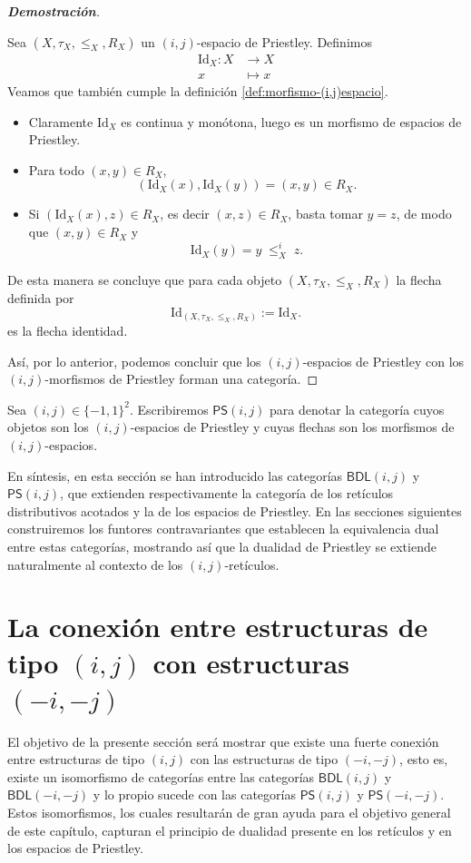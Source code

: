 \documentclass[12pt]{book}
\newcommand{\Id}{\mathrm{Id}}
\newcommand{\BDL}{\mathsf{BDL}}
\newcommand{\PS}{\mathsf{PS}}
\begin{document}
\begin{proof}[\textbf{Demostración}]
\begin{itemize}
Sea $(X,\tau_X,\le_X,R_X)$ un $(i,j)$-espacio de Priestley. Definimos
\begin{align*}
\Id_X\colon X &\to X\\
x &\mapsto x
\end{align*}
Veamos que también cumple la definición \ref{def:morfismo-(i,j)espacio}.
\begin{itemize}
\item Claramente $\Id_X$ es continua y monótona, luego es un morfismo de espacios de Priestley.

\item Para todo $(x,y)\in R_X$,
\[
(\Id_X(x),\Id_X(y))=(x,y)\in R_X.
\]

\item   Si $(\Id_X(x),z)\in R_X$, es decir $(x,z)\in R_X$, basta tomar $y=z$, de modo que $(x,y)\in R_X$ y  
\[
\Id_X(y)=y\;\le_X^i\;z.
\]
\end{itemize}

De esta manera se concluye que para cada objeto $(X,\tau_X,\le_X,R_X)$ la flecha definida por 
\[
\Id_{(X,\tau_X,\le_X,R_X)} := \Id_X.
\]
es la flecha identidad.

\end{itemize}
Así, por lo anterior, podemos concluir que los $(i,j)$-espacios de Priestley con los $(i,j)$-morfismos de Priestley forman una categoría.
\end{proof}
Sea $(i,j) \in \{-1,1\}^{2}$. Escribiremos $\PS(i,j)$ para denotar la categoría cuyos objetos son los $(i,j)$-espacios de Priestley y cuyas flechas son los morfismos de $(i,j)$-espacios.


\medskip
En síntesis, en esta sección se han introducido las categorías
$\BDL(i,j)$ y $\mathsf{PS}(i,j)$,
que extienden respectivamente la categoría de los retículos distributivos acotados
y la de los espacios de Priestley. En las secciones siguientes construiremos los funtores contravariantes
que establecen la equivalencia dual entre estas categorías, mostrando así que la dualidad de Priestley se extiende naturalmente al contexto de los $(i,j)$-retículos.







\section{La conexión entre estructuras de tipo $(i,j)$ con estructuras $(-i,-j)$}

El objetivo de la presente sección será mostrar que existe una fuerte conexión entre estructuras de tipo $(i,j)$ con las estructuras de tipo $(-i,-j)$, esto es, existe un isomorfismo de categorías entre las categorías $\BDL(i,j)$ y $\BDL(-i,-j)$ y lo propio sucede con las categorías $\PS(i,j)$ y $\PS(-i,-j)$. Estos isomorfismos, los cuales
resultarán de gran ayuda para el objetivo general de este capítulo, capturan el principio de dualidad presente en los retículos y en los espacios de Priestley.
\end{document}
